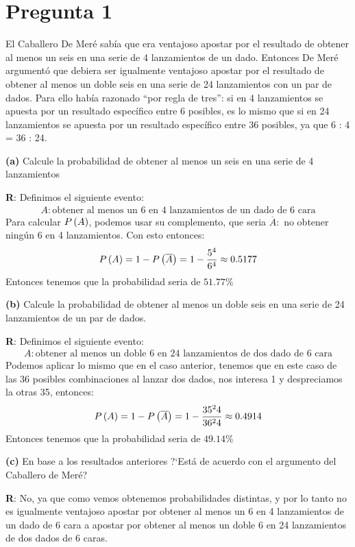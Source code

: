 
\section*{Pregunta 1}

El Caballero De Meré sabía que era ventajoso apostar por el resultado de obtener al menos un seis en una serie de 4 lanzamientos de un dado. Entonces De Meré argumentó que debiera ser igualmente ventajoso apostar por el resultado de obtener al menos un doble seis en una serie de 24 lanzamientos con un par de dados. Para ello había razonado “por regla de tres”: si en 4 lanzamientos se apuesta por un resultado específico entre 6 posibles, es lo mismo que si en 24 lanzamientos se apuesta por un resultado específico entre 36 posibles, ya que 6 : 4 = 36 : 24.

\vspace{0.40cm}
\textbf{(a)} Calcule la probabilidad de obtener al menos un seis en una serie de 4 lanzamientos

\textbf{R}: Definimos el siguiente evento:
\begin{align*}
	A: \text{obtener al menos un 6 en 4 lanzamientos de un dado de 6 cara}
\end{align*}
Para calcular ${P} \left( {A} \right)$, podemos usar su complemento, que seria $\overline{A}:$ no obtener ningún 6 en 4 lanzamientos. Con esto entonces:
\begin{align*}
	{P} \left( {A} \right) = 1 - {P} \left( {\overline{A}} \right) = 1 - \frac{5^4}{6^4} \approx 0.5177
\end{align*}
Entonces tenemos que la probabilidad seria de $51.77\%$


\vspace{0.60cm}
\textbf{(b)} Calcule la probabilidad de obtener al menos un doble seis en una serie de 24 lanzamientos de un par de dados.

\textbf{R}: Definimos el siguiente evento:
\begin{align*}
A: \text{obtener al menos un doble 6 en 24 lanzamientos de dos dado de 6 cara}
\end{align*}
Podemos aplicar lo mismo que en el caso anterior, tenemos que en este caso de las 36 posibles combinaciones al lanzar dos dados, nos interesa 1 y despreciamos la otras 35, entonces:
\begin{align*}
{P} \left( {A} \right) = 1 - {P} \left( {\overline{A}} \right) = 1 - \frac{35^24}{36^24} \approx 0.4914
\end{align*}
Entonces tenemos que la probabilidad seria de $49.14\%$


\vspace{0.60cm}
\textbf{(c)} En base a los resultados anteriores ?`Está de acuerdo con el argumento del Caballero de Meré?

\textbf{R}: No, ya que como vemos obtenemos probabilidades distintas, y por lo tanto no es igualmente ventajoso apostar por obtener al menos un 6 en 4 lanzamientos de un dado de 6 cara
a apostar por obtener al menos un doble 6 en 24 lanzamientos de dos dados de 6 caras.